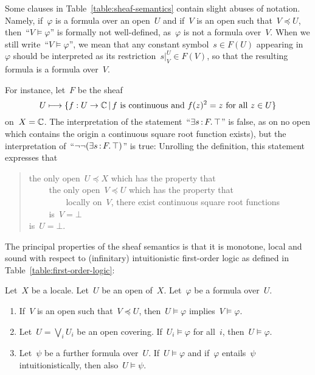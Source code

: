 \documentclass{ws-rv9x6}
\begin{document}
{Some clauses in Table~\ref{table:sheaf-semantics} contain slight abuses of
notation. Namely, if~$\varphi$ is a formula over an open~$U$ and if~$V$ is an
open such that~$V \preceq U$, then~``$V \models \varphi$'' is formally not
well-defined, as~$\varphi$ is not a formula over~$V$. When we still write~``$V
\models \varphi$'', we mean that any constant symbol~$s \in F(U)$ appearing
in~$\varphi$ should be interpreted as its restriction~$s|^U_V \in F(V)$, so
that the resulting formula is a formula over~$V$.

\begin{example}\label{ex:negneg}
For instance, let~$F$ be the sheaf
\[ U \longmapsto \{ f : U \to \mathbb{C} \,|\, \text{$f$ is continuous and~$f(z)^2 =
z$ for all~$z \in U$} \} \]
on~$X = \mathbb{C}$. The interpretation of the statement~``$\exists s\,{:}\,F\mathpunct{.} \top$'' is
false, as on no open which contains the origin a continuous square root
function exists), but the interpretation of~``$\neg\neg(\exists s\,{:}\,F\mathpunct{.} \top)$''
is true: Unrolling the definition, this statement expresses that
\begin{quote}
the only open~$U \preceq X$ which has the property that \\
${\qquad}$ the only open~$V \preceq U$ which has the property that \\
${\qquad\qquad}$ locally on~$V$, there exist continuous square root functions \\
${\qquad}$ is~$V = \bot$ \\
is~$U = \bot$.
\end{quote}
\end{example}


The principal properties of the sheaf semantics is that it is monotone, local
and sound with respect to (infinitary) intuitionistic first-order logic as
defined in Table~\ref{table:first-order-logic}:

\begin{theorem}\label{thm:basic-properties-sheaf-semantics}
Let~$X$ be a locale. Let~$U$ be an open of~$X$. Let~$\varphi$ be
a formula over~$U$.
\begin{enumerate}
\item If~$V$ is an open such that~$V \preceq U$, then~$U \models
\varphi$ implies~$V \models \varphi$.
\item Let~$U = \bigvee_i U_i$ be an open covering. If~$U_i \models
\varphi$ for all~$i$, then~$U \models \varphi$.
\item Let~$\psi$ be a further formula over~$U$. If~$U \models
\varphi$ and if~$\varphi$ entails~$\psi$ intuitionistically, then also~$U
\models \psi$.
\end{enumerate}
\end{theorem}

}
\end{document}
